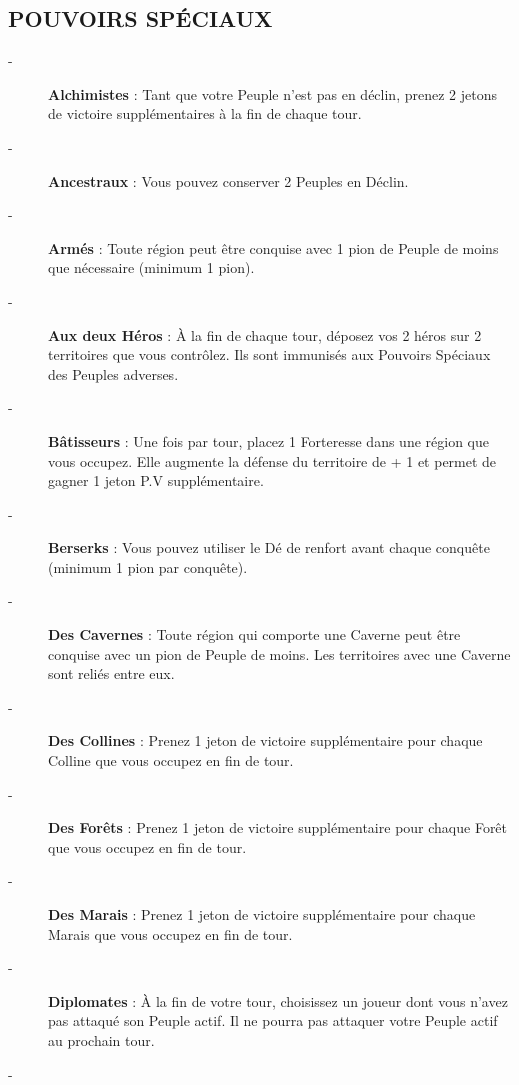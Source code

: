 \documentclass{scrartcl}%
\begin{document}
\subsection{ POUVOIRS SPÉCIAUX
}%
\label{subsec:POUVOIRSSPCIAUX}%
\begin{description}%
\item[{-} ]%
%
\textbf{Alchimistes}%
\textit{ }%
 : Tant que votre Peuple n'est pas en déclin, prenez 2 jetons de victoire supplémentaires à la fin de chaque tour.
%
\item[{-} ]%
%
\textbf{Ancestraux}%
\textit{ }%
 : Vous pouvez conserver 2 Peuples en Déclin.
%
\item[{-} ]%
%
\textbf{Armés}%
\textit{ }%
 : Toute région peut être conquise avec 1 pion de Peuple de moins que nécessaire (minimum 1 pion).
%
\item[{-} ]%
%
\textbf{Aux deux Héros}%
\textit{ }%
 : À la fin de chaque tour, déposez vos 2 héros sur 2 territoires que vous contrôlez. Ils sont immunisés aux Pouvoirs Spéciaux des Peuples adverses.
%
\item[{-} ]%
%
\textbf{Bâtisseurs}%
\textit{ }%
 : Une fois par tour, placez 1 Forteresse dans une région que vous occupez. Elle augmente la défense du territoire de + 1 et permet de gagner 1 jeton P.V supplémentaire.
%
\item[{-} ]%
%
\textbf{Berserks}%
\textit{ }%
 : Vous pouvez utiliser le Dé de renfort avant chaque conquête (minimum 1 pion par conquête).
%
\item[{-} ]%
%
\textbf{Des Cavernes}%
\textit{ }%
 : Toute région qui comporte une Caverne peut être conquise avec un pion de Peuple de moins. Les territoires avec une Caverne sont reliés entre eux.
%
\item[{-} ]%
%
\textbf{Des Collines}%
\textit{ }%
 : Prenez 1 jeton de victoire supplémentaire pour chaque Colline que vous occupez en fin de tour.
%
\item[{-} ]%
%
\textbf{Des Forêts}%
\textit{ }%
 : Prenez 1 jeton de victoire supplémentaire pour chaque Forêt que vous occupez en fin de tour.
%
\item[{-} ]%
%
\textbf{Des Marais}%
\textit{ }%
 : Prenez 1 jeton de victoire supplémentaire pour chaque Marais que vous occupez en fin de tour.
%
\item[{-} ]%
%
\textbf{Diplomates}%
\textit{ }%
 : À la fin de votre tour, choisissez un joueur dont vous n'avez pas attaqué son Peuple actif. Il ne pourra pas attaquer votre Peuple actif au prochain tour.
%
\item[{-} ]%

\end{description}
\end{document}
